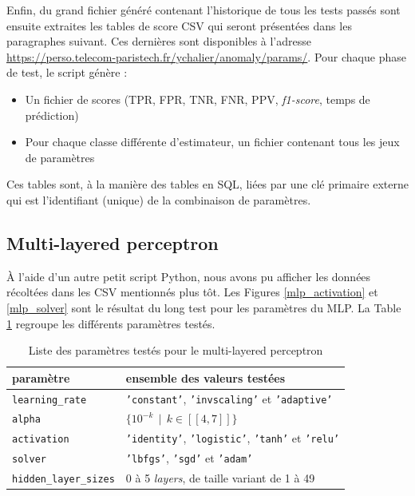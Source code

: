 \documentclass[a4paper]{report}
\begin{document}
Enfin, du grand fichier généré contenant l'historique de tous les tests passés sont ensuite extraites les tables de score CSV qui seront présentées dans les paragraphes suivant. Ces dernières sont disponibles à l'adresse \url{https://perso.telecom-paristech.fr/ychalier/anomaly/params/}. Pour chaque phase de test, le script génère :
\begin{itemize}
\item Un fichier de scores (TPR, FPR, TNR, FNR, PPV, \emph{f1-score}, temps de prédiction)
\item Pour chaque classe différente d'estimateur, un fichier contenant tous les jeux de paramètres
\end{itemize}
Ces tables sont, à la manière des tables en SQL, liées par une clé primaire externe qui est l'identifiant (unique) de la combinaison de paramètres.


\subsection{Multi-layered perceptron}

À l'aide d'un autre petit script Python, nous avons pu afficher les données récoltées dans les CSV mentionnés plus tôt. Les Figures \ref{mlp_activation} et \ref{mlp_solver} sont le résultat du long test pour les paramètres du MLP. La Table \ref{params_mlp} regroupe les différents paramètres testés.

\begin{table}
\centering
\begin{tabular}{ll}
paramètre & ensemble des valeurs testées \\
\hline
\texttt{learning\_rate} & \texttt{'constant'}, \texttt{'invscaling'} et \texttt{'adaptive'}\\
\texttt{alpha} & $\{10^{-k} \>\> | \>\> k \in [\![4, 7]\!] \}$ \\
\texttt{activation} & \texttt{'identity'}, \texttt{'logistic'}, \texttt{'tanh'} et \texttt{'relu'} \\
\texttt{solver} & \texttt{'lbfgs'}, \texttt{'sgd'} et \texttt{'adam'}\\
\texttt{hidden\_layer\_sizes} & 0 à 5 \emph{layers}, de taille variant de 1 à 49\\
\end{tabular}
\caption{Liste des paramètres testés pour le multi-layered perceptron\label{params_mlp}}
\end{table}
\end{document}
